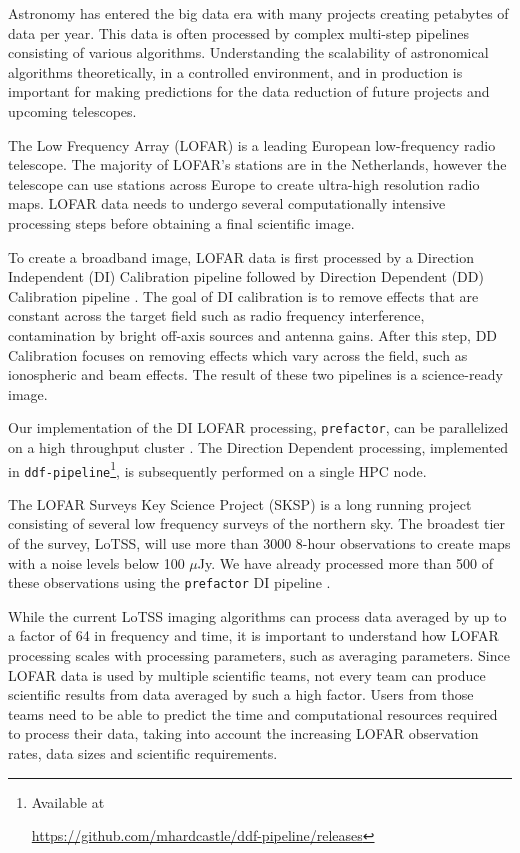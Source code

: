 
Astronomy has entered the big data era with many projects creating petabytes of data per year. This data is often processed by complex multi-step pipelines consisting of various algorithms. Understanding the scalability of astronomical algorithms theoretically, in a controlled environment, and in production is important for making predictions for the data reduction of future projects and upcoming telescopes. 

The Low Frequency Array (LOFAR) \citep{LOFAR} is a leading European low-frequency radio telescope. The majority of LOFAR's stations are in the Netherlands, however the telescope can use stations across Europe to create ultra-high resolution radio maps. LOFAR data needs to undergo several computationally intensive processing steps before obtaining a final scientific image. 

To create a broadband image, LOFAR data is first processed by a Direction Independent (DI) Calibration pipeline followed by Direction Dependent (DD) Calibration pipeline \citep[e.g.][]{lofar_prefactor, Wendy_bootes,tassesmirnov, tasse2018faceting}. The goal of DI calibration is to remove effects that are constant across the target field such as radio frequency interference, contamination by bright off-axis sources and antenna gains. After this step, DD Calibration focuses on removing effects which vary across the field, such as ionospheric and beam effects. The result of these two pipelines is a science-ready image. 

Our implementation of the DI LOFAR processing, \texttt{prefactor}, can be parallelized on a high throughput cluster \citep{mechev17}. The Direction Dependent processing, implemented in \texttt{ddf-pipeline}\footnote{Available at \raggedright\href{https://github.com/mhardcastle/ddf-pipeline/releases}{https://github.com/mhardcastle/ddf-pipeline/releases}}, is subsequently performed on a single HPC node. 

The LOFAR Surveys Key Science Project (SKSP) \citep{lotss, LOTSS_DR2} is a long running project consisting of several low frequency surveys of the northern sky. The broadest tier of the survey, LoTSS, will use more than 3000 8-hour observations to create maps with a noise levels below 100 $\mu$Jy. We have already processed more than 500 of these observations using the \texttt{prefactor} DI pipeline \citep{lofar_prefactor, prefactor_zenodo}. 

While the current LoTSS imaging algorithms can process data averaged by up to a factor of 64 in frequency and time, it is important to understand how LOFAR processing scales with processing parameters, such as averaging parameters. Since LOFAR data is used by multiple scientific teams, not every team can produce scientific results from data averaged by such a high factor. Users from those teams need to be able to predict the time and computational resources required to process their data, taking into account the increasing LOFAR observation rates, data sizes and scientific requirements. 

